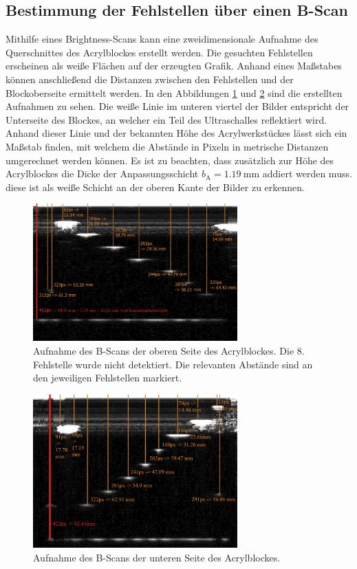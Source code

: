 \subsection{Bestimmung der Fehlstellen über einen B-Scan}
\label{subsec:b_scan}
Mithilfe eines Brightness-Scans kann eine zweidimensionale Aufnahme des Querschnittes des Acrylblockes erstellt werden. Die gesuchten Fehlstellen erscheinen als 
weiße Flächen auf der erzeugten Grafik. Anhand eines Maßstabes können anschließend die Distanzen zwischen den Fehlstellen und der Blockoberseite ermittelt werden.
In den Abbildungen \ref{fig:B_Scan_oben} und \ref{fig:B_Scan_unten} sind die erstellten Aufnahmen zu sehen. Die weiße Linie im unteren viertel der Bilder entspricht
der Unterseite des Blockes, an welcher ein Teil des Ultraschalles reflektiert wird. Anhand dieser Linie und der bekannten Höhe des Acrylwerkstückes lässt sich ein
Maßstab finden, mit welchem die Abstände in Pixeln in metrische Distanzen umgerechnet werden können. Es ist zu beachten, dass zusätzlich zur Höhe des Acrylblockes
die Dicke der Anpassungsschicht $b_\text{A} = \qty{1.19}{\milli\metre}$ addiert werden muss. diese ist als weiße Schicht an der oberen Kante der Bilder zu erkennen.

\begin{figure}
  \centering
\includegraphics[width=0.7\textwidth]{content/B_Scan_oben_auswertung.pdf}
  \caption{Aufnahme des B-Scans der oberen Seite des Acrylblockes. Die 8. Fehlstelle wurde nicht detektiert.
  Die relevanten Abstände sind an den jeweiligen Fehlstellen markiert.}
  \label{fig:B_Scan_oben}
\end{figure}

\begin{figure}
  \centering
\includegraphics[width=0.7\textwidth]{content/B_Scan_unten_auswertung.pdf}
  \caption{Aufnahme des B-Scans der unteren Seite des Acrylblockes.}
  \label{fig:B_Scan_unten}
\end{figure}

